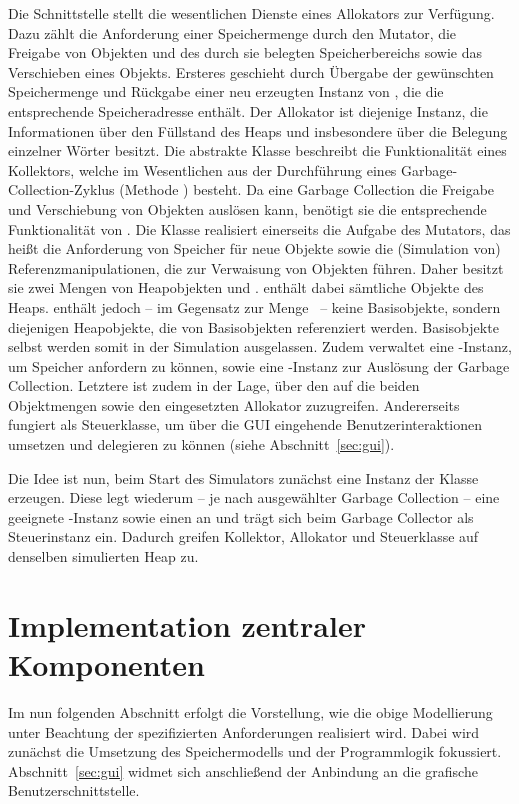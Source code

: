 Die Schnittstelle  stellt die wesentlichen Dienste eines Allokators zur Verfügung.
Dazu zählt die Anforderung einer Speichermenge durch den Mutator, die Freigabe von Objekten und des durch sie belegten Speicherbereichs sowie das Verschieben eines Objekts.
Ersteres geschieht durch Übergabe der gewünschten Speichermenge und Rückgabe einer neu erzeugten Instanz von , die die entsprechende Speicheradresse enthält.
Der Allokator ist diejenige Instanz, die Informationen über den Füllstand des Heaps und insbesondere über die Belegung einzelner Wörter besitzt.
Die abstrakte Klasse  beschreibt die Funktionalität eines Kollektors, welche im Wesentlichen aus der Durchführung eines Garbage-Collection-Zyklus (Methode ) besteht.
Da eine Garbage Collection die Freigabe und Verschiebung von Objekten auslösen kann, benötigt sie die entsprechende Funktionalität von .
Die Klasse  realisiert einerseits die Aufgabe des Mutators, das heißt die Anforderung von Speicher für neue Objekte sowie die (Simulation von) Referenzmanipulationen, die zur Verwaisung von Objekten führen.
Daher besitzt sie zwei Mengen von Heapobjekten  und .
 enthält dabei sämtliche Objekte des Heaps.
 enthält jedoch -- im Gegensatz zur Menge \Roots\ -- keine Basisobjekte, sondern diejenigen Heapobjekte, die von Basisobjekten referenziert werden.
Basisobjekte selbst werden somit in der Simulation ausgelassen.
Zudem verwaltet  eine -Instanz, um Speicher anfordern zu können, sowie eine -Instanz zur Auslösung der Garbage Collection.
Letztere ist zudem in der Lage, über den  auf die beiden Objektmengen sowie den eingesetzten Allokator zuzugreifen.
Andererseits fungiert  als Steuerklasse, um über die GUI eingehende Benutzerinteraktionen umsetzen und delegieren zu können (siehe Abschnitt~\ref{sec:gui}).

Die Idee ist nun, beim Start des Simulators zunächst eine Instanz der Klasse  erzeugen.
Diese legt wiederum -- je nach ausgewählter Garbage Collection -- eine geeignete -Instanz sowie einen  an und trägt sich beim Garbage Collector als Steuerinstanz ein.
Dadurch greifen Kollektor, Allokator und Steuerklasse auf denselben simulierten Heap zu.

\section{Implementation zentraler Komponenten}
\label{sec:implementation}
Im nun folgenden Abschnitt erfolgt die Vorstellung, wie die obige Modellierung unter Beachtung der spezifizierten Anforderungen realisiert wird.
Dabei wird zunächst die Umsetzung des Speichermodells und der Programmlogik fokussiert.
Abschnitt~\ref{sec:gui} widmet sich anschließend der Anbindung an die grafische Benutzerschnittstelle.


